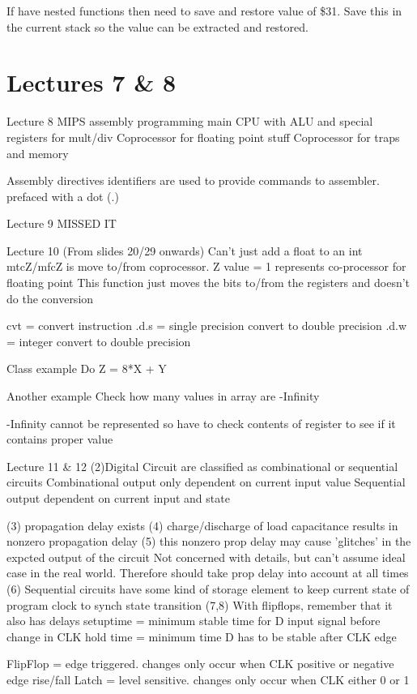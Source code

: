 \documentclass{article}
\begin{document}
		If have nested functions then need to save and restore value of \$31. Save this in the current stack so the value can be extracted and restored.
		

\section*{Lectures 7 \& 8}


Lecture 8
	MIPS assembly programming
		main CPU with ALU and special registers for mult/div
		Coprocessor for floating point stuff
		Coprocessor for traps and memory

		Assembly directives
			identifiers are used to provide commands to assembler.
			prefaced with a dot (.)

Lecture 9
	MISSED IT

Lecture 10 (From slides 20/29 onwards)
	Can't just add a float to an int
	mtcZ/mfcZ is move to/from coprocessor. Z value = 1 represents co-processor for floating point
		This function just moves the bits to/from the registers and doesn't do the conversion

	cvt = convert instruction
	.d.s = single precision convert to double precision
	.d.w = integer convert to double precision

	Class example
		Do Z = 8*X + Y

	Another example
		Check how many values in array are -Infinity

		-Infinity cannot be represented so have to check contents of register to see if it contains proper value

Lecture 11 \& 12
	(2)Digital Circuit are classified as combinational or sequential circuits
		Combinational	output only dependent on current input value
		Sequential 	output dependent on current input and state

	(3) propagation delay exists
	(4) charge/discharge of load capacitance results in nonzero propagation delay
	(5) this nonzero prop delay may cause 'glitches' in the expcted output of the circuit
		Not concerned with details, but can't assume ideal case in the real world. Therefore should take prop delay into account at all times
	(6) Sequential circuits
		have some kind of storage element to keep current state of program
		clock to synch state transition
	(7,8) With flipflops, remember that it also has delays
		setuptime = minimum stable time for D input signal before change in CLK
		hold time = minimum time D has to be stable after CLK edge

		FlipFlop = edge triggered. changes only occur when CLK positive or negative edge rise/fall
		Latch = level sensitive. changes only occur when CLK either 0 or 1
\end{document}
